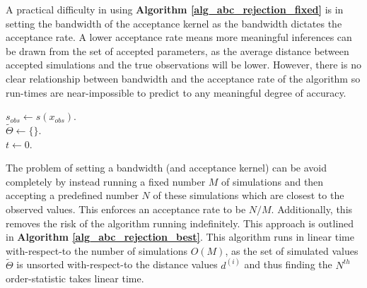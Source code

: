 \documentclass[11pt,a4paper]{article}
\theoremstyle{break}
\begin{document}
  \par A practical difficulty in using \textbf{Algorithm \ref{alg_abc_rejection_fixed}} is in setting the bandwidth of the acceptance kernel as the bandwidth dictates the acceptance rate. A lower acceptance rate means more meaningful inferences can be drawn from the set of accepted parameters, as the average distance between accepted simulations and the true observations will be lower. However, there is no clear relationship between bandwidth and the acceptance rate of the algorithm so run-times are near-impossible to predict to any meaningful degree of accuracy.

  \begin{box_algorithm}\label{alg_abc_rejection_best}
    \begin{algorithm}[H]
      $s_{obs}\leftarrow s(x_{obs})$.\\
      $\tilde\Theta\leftarrow\{\}$.\\
      $t\leftarrow0$.\\
    \end{algorithm}
  \end{box_algorithm}

  \par The problem of setting a bandwidth (and acceptance kernel) can be avoid completely by instead running a fixed number $M$ of simulations and then accepting a predefined number $N$ of these simulations which are closest to the observed values. This enforces an acceptance rate to be $N/M$. Additionally, this removes the risk of the algorithm running indefinitely. This approach is outlined in \textbf{Algorithm \ref{alg_abc_rejection_best}}. This algorithm runs in linear time with-respect-to the number of simulations $O(M)$, as the set of simulated values $\tilde\Theta$ is unsorted with-respect-to the distance values $d^{(i)}$ and thus finding the $N^{th}$ order-statistic takes linear time.
\end{document}
